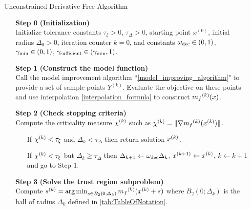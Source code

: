 \begin{algorithm}[H]
    \caption{Unconstrained Derivative Free Algorithm}
    \label{unconstrained_dfo}
    \begin{itemize}
        \item[\textbf{Step 0}] \textbf{(Initialization)} \\
            Initialize tolerance constants $\tau_{\xi} > 0$, $\tau_{\Delta} > 0$, starting point $x^{(0)}$, initial radius $\Delta_0 > 0$, iteration counter $k=0$, and constants $\omega_{\text{dec}} \in (0, 1)$, $ \gamma_{\text{min}} \in (0, 1)$, $\gamma_{\text{sufficient}} \in (\gamma_{\text{min}}, 1)$.
            
        \item[\textbf{Step 1}] \textbf{(Construct the model function)} \\
            Call the model improvement algorithm ``\cref{model_improving_algorithm}" to provide a set of sample points $Y^{(k)}$.
            Evaluate the objective on these points and use interpolation \cref{interpolation_formula} to construct ${{m}_f}^{(k)}(x)$.
        
        \item[\textbf{Step 2}] \textbf{(Check stopping criteria)} \\
            Compute the criticality measure ${\chi^{(k)}}$ such as ${\chi^{(k)}} = \|\nabla{{m}_f}^{(k)}({x}^{(k)})\|$. \begin{itemize}
                \item[] If $ {\chi^{(k)}} < \tau_{\xi} $ and $\Delta_k<\tau_{\Delta}$ then return solution ${x}^{(k)}$.
                \item[] If $ {\chi^{(k)}} < \tau_{\xi} $ but $\Delta_k\ge\tau_{\Delta}$ then  
                $\Delta_{k+1} \gets \omega_{\text{dec}}\Delta_{k}$, 
                $x^{(k+1)} \gets {x}^{(k)}$,
                $k \gets k+1$ and go to Step 1.
            \end{itemize}
        
        \item[\textbf{Step 3}] \textbf{(Solve the trust region subproblem)} \\
            Compute ${s}^{(k)} = \operatorname*{arg\,min}_{s\in B_2(0; \Delta_k)} {{m}_f}^{(k)} ({x}^{(k)} + s)$ where $B_2(0; \Delta_k)$ is the ball of radius $\Delta_k$ defined in \cref{tab:TableOfNotation}.
            

\end{itemize}
\end{algorithm}
